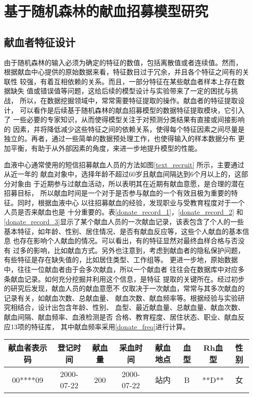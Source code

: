\documentclass[main.tex]{subfiles}
\begin{document}
\chapter{基于随机森林的献血招募模型研究}

\section{献血者特征设计}
由于随机森林的输入必须为确定的特征的数值，包括离散值或者连续值。然而，
根据献血中心提供的原始数据来看，特征数目过于冗余，并且各个特征之间有的关联性
较强，有着互相依赖的关系。而且，一部分特征在某些献血者样本上存在数据缺失
值或错误值等问题，这给后续的模型设计与实验带来了一定的困扰与挑战，
所以，在数据挖掘领域中，常常需要特征提取的操作。献血者的特征提取设计，
可以看作是后续基于随机森林的献血招募模型的数据特征提取模块，它引入了
一些必要的专家知识，从而使得模型关注于对预测分类结果有直接或间接影响的
因素，并将降低减少这些特征之间的依赖关系，使得每个特征因素之间尽量是
独立的。再者，通过一些简单的数据预处理工作，也使得输入的样本数据分布
更加平衡，有助于从外部因素的角度，来进一步地提升模型的性能。

血液中心通常使用的短信招募献血人员的方法如图\ref{text_recruit}
所示，主要通过从近一年的
献血对象中，选择年龄不超过60岁且献血间隔达到6个月以上的，这部分对象由
于近期参与过献血活动，所以表明其在近期有献血意愿，是合理的潜在招募目标，
所以献血时间是一个对于是否参与献血的一个有效且极为重要的特征。同时，根据血液中心
以往招募献血的经验，发现职业与受教育程度对于一个人员是否来献血也是
十分重要的。表\ref{donate_record_1}，\ref{donate_record_2}
和\ref{donate_record_3}显示了某个献血人员的一次献血记录，该表包含了个人的一些
基本特征，如年龄、性别、居住情况、是否有献血反应等，这些个人献血的基本信息
也存在影响个人献血的情况。可以看出，有的特征显然对最终血样合格与否没有
过多的影响，比如献血方式。另外也注意到，考虑到献血者的隐私保护问题，
有些特征是存在缺失值的，比如居住类型、工作组等。
更进一步地，原始数据中，往往一位献血者由于会多次献血，所以一个献血者
往往会在数据库中对应多条献血记录。如何充分挖掘并利用这个信息，是特征
提取的关键所在。经过初步的研究后发现，献血人员的献血意愿不
仅取决于一次献血，常常与其多次献血的记录有关，如献血次数、总献血量、
献血次数、献血频率等。根据经验与实验研究相结合，设计出包含年龄、性别、
血型、最近献血量、总献血量、献血次数、献血间隔、献血频率、血液检测是否
合格、教育程度、居住状态、职业、献血反应13项的特征库，
其中献血频率采用\ref{donate_freq}进行计算。

\begin{table*}[htbp!]
    \caption{某献血人员的献血记录}
    \label{donate_record_1}
    \centering
    \begin{tabular}{cccccccc}
    \hline
    献血者表示码   & 登记时间       & 献血量 & 采血时间       & 献血地点 & 血型 & Rh血型  & 性别  \\ \hline
    00****09 & 2000-07-22 & 200 & 2000-07-22 & 站内   & B  & **D** & 女 \\ \hline
    \end{tabular}
\end{table*}
\end{document}
